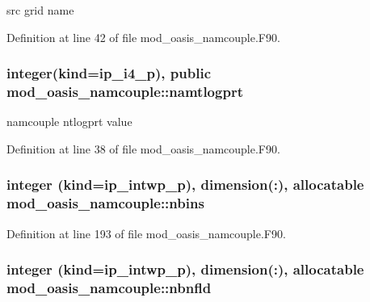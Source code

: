 src grid name 



Definition at line 42 of file mod\+\_\+oasis\+\_\+namcouple.\+F90.

\hypertarget{classmod__oasis__namcouple_a45fbbd2941f5d71991d409f63e31cf02}{
\subsubsection[{namtlogprt}]{\setlength{\rightskip}{0pt plus 5cm}integer(kind=ip\+\_\+i4\+\_\+p), public mod\+\_\+oasis\+\_\+namcouple\+::namtlogprt}}\label{classmod__oasis__namcouple_a45fbbd2941f5d71991d409f63e31cf02}


namcouple ntlogprt value 



Definition at line 38 of file mod\+\_\+oasis\+\_\+namcouple.\+F90.

\hypertarget{classmod__oasis__namcouple_a4c609c48a20205e1d2aa9938d7babc92}{
\subsubsection[{nbins}]{\setlength{\rightskip}{0pt plus 5cm}integer (kind=ip\+\_\+intwp\+\_\+p), dimension(\+:), allocatable mod\+\_\+oasis\+\_\+namcouple\+::nbins\hspace{0.3cm}{\ttfamily [private]}}}\label{classmod__oasis__namcouple_a4c609c48a20205e1d2aa9938d7babc92}


Definition at line 193 of file mod\+\_\+oasis\+\_\+namcouple.\+F90.

\hypertarget{classmod__oasis__namcouple_af0c7b1e7e49159c6b9c0dc3663264346}{
\subsubsection[{nbnfld}]{\setlength{\rightskip}{0pt plus 5cm}integer (kind=ip\+\_\+intwp\+\_\+p), dimension(\+:), allocatable mod\+\_\+oasis\+\_\+namcouple\+::nbnfld\hspace{0.3cm}{\ttfamily [private]}}}\label{classmod__oasis__namcouple_af0c7b1e7e49159c6b9c0dc3663264346}


